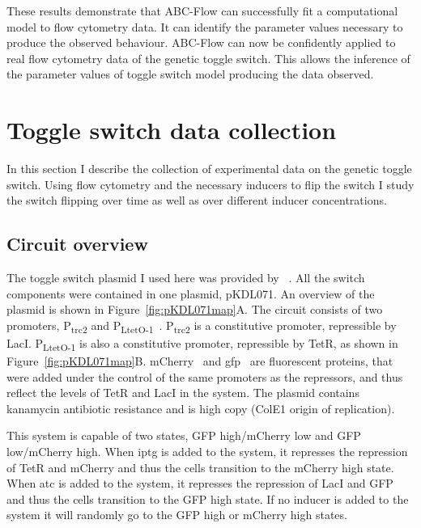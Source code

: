 \clearpage
These results demonstrate that ABC-Flow can successfully fit a computational model to flow cytometry data. It can identify the parameter values necessary to produce the observed behaviour. ABC-Flow can now be confidently applied to real flow cytometry data of the genetic toggle switch. This allows the inference of the parameter values of toggle switch model producing the data observed. %


\section{Toggle switch data collection}

In this section I describe the collection of experimental data on the genetic toggle switch. Using flow cytometry and the necessary inducers to flip the switch I study the switch flipping over time as well as over different inducer concentrations. 

\subsection{Circuit overview}

The toggle switch plasmid I used here was provided by ~\textcite{Litcofsky:2012gr}. All the switch components were contained in one plasmid, pKDL071. An overview of the plasmid is shown in Figure~\ref{fig:pKDL071map}A. The circuit consists of two promoters, P\textsubscript{trc2} and P\textsubscript{LtetO-1}~\autocite{Lutz:1997ti}. P\textsubscript{trc2} is a constitutive promoter, repressible by LacI. P\textsubscript{LtetO-1} is also a constitutive promoter, repressible by TetR, as shown in Figure~\ref{fig:pKDL071map}B. mCherry~\autocite{Shaner:2004vy} and \acrshort{gfp}~\autocite{SHIMOMURA:1962va} are fluorescent proteins, that were added under the control of the same promoters as the repressors, and thus reflect the levels of TetR and LacI in the system. The plasmid contains kanamycin antibiotic resistance and is high copy (ColE1 origin of replication).

This system is capable of two states, GFP high/mCherry low and GFP low/mCherry high. When \acrshort{iptg} is added to the system, it represses the repression of TetR and mCherry and thus the cells transition to the mCherry high state. When \acrshort{atc} is added to the system, it represses the repression of LacI and GFP and thus the cells transition to the GFP high state. If no inducer is added to the system it will randomly go to the GFP high or mCherry high states.

